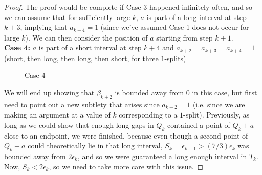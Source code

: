 \documentclass[10pt,a4paper]{amsart}
\begin{document}
\begin{proof}
The proof would be complete if Case 3 happened infinitely often, and so we can assume that for sufficiently large $k$, 
$a$ is part of a long interval at step $k+3$, implying that $a_{k+4} = 1$ (since we've assumed Case 1 does not occur for large $k$). We can then consider the position of $a$ starting from step $k+1$.\\

\noindent
\textbf{Case 4:} $a$ is part of a short interval at step $k+4$ and $a_{k+2} = a_{k+3} = a_{k+4} = 1$ 
(short, then long, then long, then short, for three $1$-splits)\\

\begin{figure}[h]
\centering
{}
\caption{Case 4}\label{fig4}
\end{figure}

We will end up showing that $\beta_{k+2}$ is bounded away from $0$ in this case, but first need to point out a new subtlety that arises since $a_{k+2} = 1$ (i.e. since we are making an argument at a value of $k$ corresponding to a $1$-split). Previously, as long as we could show that enough long gaps in $Q_k$ contained a point of $Q_k + a$ close to an endpoint, we were finished, because even though a second point of $Q_k + a$ could theoretically lie in that long interval, $S_k = \epsilon_{k-1} > (7/3) \epsilon_k$ was bounded away from $2\epsilon_k$, and so we were guaranteed a long enough interval in $T_k$. Now, $S_k < 2\epsilon_k$, so we need to take more care with this issue. 


\end{proof}
\end{document}
